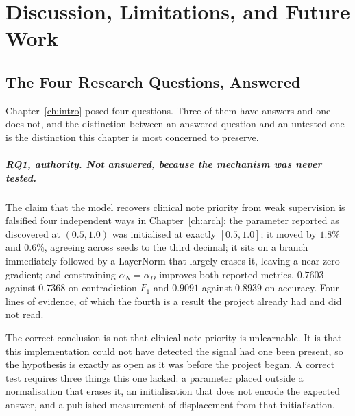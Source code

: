%
%

\chapter{Discussion, Limitations, and Future Work}
\label{ch:discussion}

\section{The Four Research Questions, Answered}
\label{sec:disc-rqs}

Chapter~\ref{ch:intro} posed four questions. Three of them have answers and one
does not, and the distinction between an answered question and an untested one
is the distinction this chapter is most concerned to preserve.

\paragraph{RQ1, authority. Not answered, because the mechanism was never
tested.} The claim that the model recovers clinical note priority from weak
supervision is falsified four independent ways in Chapter~\ref{ch:arch}: the
parameter reported as discovered at $(0.5, 1.0)$ was initialised at exactly
$[0.5, 1.0]$; it moved by $1.8\%$ and $0.6\%$, agreeing across seeds to the
third decimal; it sits on a branch immediately followed by a LayerNorm that
largely erases it, leaving a near-zero gradient; and constraining
$\alpha_N = \alpha_D$ improves both reported metrics, $0.7603$ against $0.7368$
on contradiction $F_1$ and $0.9091$ against $0.8939$ on accuracy. Four lines of
evidence, of which the fourth is a result the project already had and did not
read.

The correct conclusion is not that clinical note priority is unlearnable. It is
that this implementation could not have detected the signal had one been
present, so the hypothesis is exactly as open as it was before the project
began. A correct test requires three things this one lacked: a parameter placed
outside a normalisation that erases it, an initialisation that does not encode
the expected answer, and a published measurement of displacement from that
initialisation.

